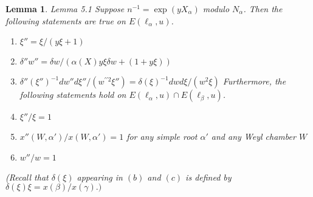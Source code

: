 \documentclass{memo-l}
\newtheorem{lemma}[theorem]{Lemma}
\theoremstyle{definition}
\theoremstyle{remark}
\numberwithin{section}{chapter}
\numberwithin{equation}{chapter}
\begin{document}
\begin{lemma}{Lemma 5.1} Suppose $n^{-1} = \exp(yX_{{\alpha}})$ modulo
$N_{{\alpha}}$.  Then the following statements are true on
$E({\ell}_{{\alpha}},u)$.

\medskip
\begin{enumerate}[label=\alph*)]
\item ${\xi}'' = {\xi}/(y{\xi}+1)$
\smallskip
\item ${\delta}''w'' = {\delta}w/({\alpha}(X)y{\xi}{\delta}w + (1+y{\xi}))$
\smallskip
\item ${\delta}''({\xi}'')^{-1}dw''d{\xi''}/(w^{\prime\prime2}{\xi''}) =
{\delta}({\xi})^{-1}dwd{\xi}/(w^{2}{\xi})$
\medskip
Furthermore, the following statements hold on $E({\ell}_{{\alpha}},u)
\cap E({\ell}_{{\beta}},u)$.
\smallskip
\item ${\xi}''/{\xi} = 1$
\smallskip
\item $x''(W,{\alpha}')/x(W,{\alpha}') = 1$ for any simple root ${\alpha}'$ and
any Weyl chamber $W$
\smallskip
\item $w''/w = 1$
\end{enumerate}
\smallskip
\noindent
(Recall that ${\delta}({\xi})$ appearing in $(b)$ and $(c)$ is defined by
${\delta}({\xi}){\xi} = x({\beta})/x({\gamma}).)$
\end{lemma}
\end{document}
